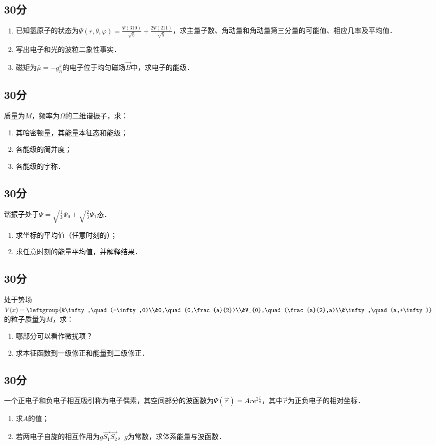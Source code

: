 
\subsection{30分}
\begin{enumerate}
\item 已知氢原子的状态为$\varPsi (r,\theta,\varphi)=\frac{\varPsi (310)}{\sqrt{5}}+\frac{2\varPsi (211)}{\sqrt{5}}$，求主量子数、角动量和角动量第三分量的可能值、相应几率及平均值．
\item 写出电子和光的波粒二象性事实．
\item 磁矩为$\bar{\mu}=-g^{\bar{s}}_{n}$的电子位于均匀磁场$\vec{B}$中，求电子的能级．
\end{enumerate}
\subsection{30分}
质量为$M$，频率为$\Omega$的二维谐振子，求：
\begin{enumerate}
\item 其哈密顿量，其能量本征态和能级；
\item 各能级的简并度；
\item 各能级的宇称．
\end{enumerate}
\subsection{30分}
谐振子处于$\varPsi =\sqrt{\frac{1}{3}}\varPsi_{0}+\sqrt{\frac{2}{3}}\varPsi_{1}$态．
\begin{enumerate}
\item 求坐标的平均值（任意时刻的）；
\item 求任意时刻的能量平均值，并解释结果．
\end{enumerate}
\subsection{30分}
处于势场$V(x)=\leftgroup{&\infty,\quad (-\infty,0)\\&0,\quad (0,\frac{a}{2})\\&V_{0},\quad (\frac{a}{2},a)\\&\infty,\quad (a,+\infty)}$的粒子质量为$M$，求：
\begin{enumerate}
\item 哪部分可以看作微扰项？
\item 求本征函数到一级修正和能量到二级修正．
\end{enumerate}
\subsection{30分}
一个正电子和负电子相互吸引称为电子偶素，其空间部分的波函数为$\varPsi (\vec{r})=Are^{2\frac{r}{a}}$，其中$\vec{r}$为正负电子的相对坐标．
\begin{enumerate}
\item 求$A$的值；
\item 若两电子自旋的相互作用为$g\vec{S_{1}}\vec{S_{2}}$，$g$为常数，求体系能量与波函数．
\end{enumerate}